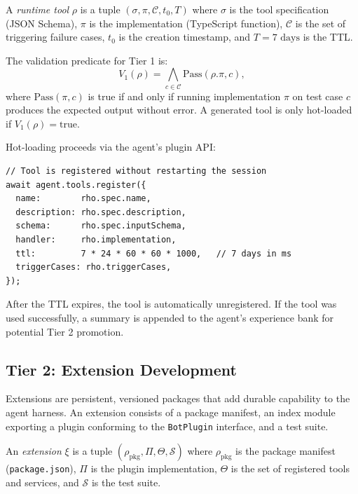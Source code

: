 \begin{definition}
A \emph{runtime tool} $\rho$ is a tuple $(\sigma, \pi, \mathcal{C}, t_0, T)$
where $\sigma$ is the tool specification (JSON Schema), $\pi$ is the
implementation (TypeScript function), $\mathcal{C}$ is the set of triggering
failure cases, $t_0$ is the creation timestamp, and $T = 7\text{ days}$ is the
TTL.
\end{definition}

The validation predicate for Tier 1 is:
\begin{equation}
    V_1(\rho) = \bigwedge_{c \in \mathcal{C}} \text{Pass}(\rho.\pi, c),
\end{equation}
where $\text{Pass}(\pi, c)$ is true if and only if running implementation $\pi$
on test case $c$ produces the expected output without error. A generated tool
is only hot-loaded if $V_1(\rho) = \text{true}$.

Hot-loading proceeds via the agent's plugin API:
\begin{verbatim}
// Tool is registered without restarting the session
await agent.tools.register({
  name:        rho.spec.name,
  description: rho.spec.description,
  schema:      rho.spec.inputSchema,
  handler:     rho.implementation,
  ttl:         7 * 24 * 60 * 60 * 1000,   // 7 days in ms
  triggerCases: rho.triggerCases,
});
\end{verbatim}

After the TTL expires, the tool is automatically unregistered. If the tool was
used successfully, a summary is appended to the agent's experience bank for
potential Tier 2 promotion.

\subsection{Tier 2: Extension Development}
\label{sec:tier2}

Extensions are persistent, versioned packages that add durable capability to the
agent harness. An extension consists of a package manifest, an index module
exporting a plugin conforming to the \texttt{BotPlugin} interface, and a test
suite.

\begin{definition}[Extension]
An \emph{extension} $\xi$ is a tuple $(\rho_{\text{pkg}}, \Pi, \Theta, \mathcal{S})$
where $\rho_{\text{pkg}}$ is the package manifest (\texttt{package.json}),
$\Pi$ is the plugin implementation, $\Theta$ is the set of registered tools and
services, and $\mathcal{S}$ is the test suite.
\end{definition}

